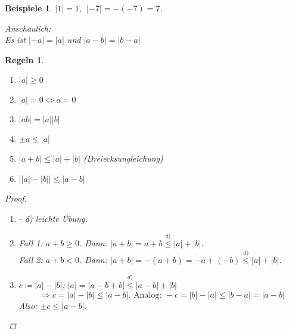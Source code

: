 \documentclass[12pt]{extreport} %
\theoremstyle{named}
\theoremstyle{dotless}
\newtheorem*{beispiele}{Beispiele}
\newtheorem*{regeln}{Regeln}
\begin{document}
\begin{beispiele}
	$|1| = 1$, $~|-7| = -(-7) = 7$. 
	
	Anschaulich:   \\
	Es ist $|-a| = |a|$ und $|a - b| = |b - a|$
\end{beispiele}


\begin{regeln} ~\
	\begin{enumerate}
		\item $|a| \geq 0$
		\item $|a| = 0 \iff a = 0$
		\item $|ab| = |a||b|$
		\item $\pm a \leq |a|$
		\item $|a + b| \leq |a| + |b|$ (Dreiecksungleichung)
		\item $\left| |a| - |b| \right| \leq |a - b|$
	\end{enumerate}	

	\begin{proof} ~\
	  \begin{enumerate}
		\item[a)]- d) leichte Übung.
		\item[e)] Fall 1: $a +b \geq 0$. Dann: $|a + b| = a + b \overset{d)}{\leq} |a| + |b|$. \\
			Fall 2: $a + b < 0$. Dann: $|a + b| = - (a + b) = - a + (- b) \overset{d)}{\leq} |a| + |b|$.
		\item[f)] $c \coloneqq |a| - |b|$; $|a| = |a - b + b| \overset{d)}{\leq} |a - b | + |b|$
			$$
				\Rightarrow c = |a| - |b| \leq |a - b|. \text{ Analog: } -c = |b| - |a| \leq |b - a| = |a - b| 
			$$
			Also: $\pm c \leq |a - b|$.
	  \end{enumerate}
	\end{proof}
\end{regeln}
\end{document}
